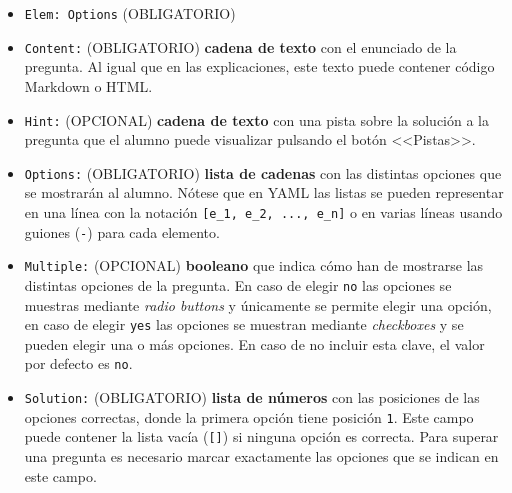 \documentclass[]{article}
\newcommand{\code}[1]{{\lstinline[basicstyle=\ttfamily,mathescape]!#1!}}
\begin{document}
\begin{itemize}
	\item \code{Elem: Options} {\sf (OBLIGATORIO)}
	\item \code{Content:} {\sf (OBLIGATORIO)} \textbf{cadena de texto} con el enunciado de la pregunta. Al igual que en las explicaciones, este texto puede contener código Markdown o HTML. 
 	\item \code{Hint:} {\sf (OPCIONAL)} \textbf{cadena de texto} con una pista sobre la solución a la pregunta que el alumno puede visualizar pulsando el botón <<Pistas>>.
 	\item \code{Options:} {\sf (OBLIGATORIO)} \textbf{lista de cadenas} con las distintas opciones que se mostrarán al alumno. Nótese que en YAML las listas se pueden representar en una línea con la notación \code{[e_1, e_2, ..., e_n]} o en varias líneas usando guiones (\code{-}) para cada elemento. 
 	\item \code{Multiple:} {\sf (OPCIONAL)} \textbf{booleano} que indica cómo han de mostrarse las distintas opciones de la pregunta. En caso de elegir \code{no} las opciones se muestras mediante \emph{radio buttons} y únicamente se permite elegir una opción, en caso de elegir \code{yes} las opciones se muestran mediante \emph{checkboxes} y se pueden elegir una o más opciones.  
 	En caso de no incluir esta clave, el valor por defecto es \code{no}.%
 	\item \code{Solution:} {\sf (OBLIGATORIO)} \textbf{lista de números} con las posiciones de las opciones correctas, donde la primera opción tiene posición \code{1}. Este campo puede contener la lista vacía (\code{[]}) si ninguna opción es correcta. Para superar una pregunta es necesario marcar exactamente las opciones que se indican en este campo.
\end{itemize}
\end{document}
